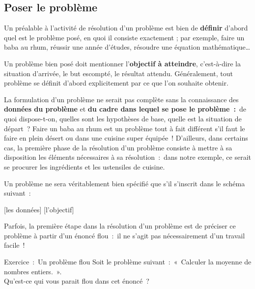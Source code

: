 	\subsection{Poser le problème }
	
		Un préalable à l’activité de résolution d’un problème est bien de
		\textbf{définir} d’abord quel est le problème posé, en quoi il consiste
		exactement ; par exemple, faire un baba au rhum, réussir une année
		d’études, résoudre une équation mathématique\dots
		
		Un problème bien posé doit mentionner l’\textbf{objectif à atteindre},
		c’est-à-dire la situation d’arrivée, le but escompté, le résultat
		attendu. Généralement, tout problème se définit d’abord explicitement
		par ce que l’on souhaite obtenir.
		
		La formulation d’un problème ne serait pas complète sans la connaissance
		des \textbf{données du problème} et \textbf{du cadre dans lequel se
		pose le problème~:}~de quoi dispose-t-on, quelles sont les hypothèses
		de base, quelle est la situation de départ~? Faire un baba au rhum est
		un problème tout à fait différent s’il faut le faire en plein désert ou
		dans une cuisine super équipée~! D’ailleurs, dans certains cas, la
		première phase de la résolution d’un problème consiste à mettre à sa
		disposition les éléments nécessaires à sa résolution~:~dans notre
		exemple, ce serait se procurer les ingrédients et les ustensiles de
		cuisine.
	
		Un problème ne sera véritablement bien spécifié que s’il s’inscrit dans
		le schéma suivant~:
		
		\begin{center}
		\begin{Ovalbox}
		{ [les données]  [l’objectif]}
		\end{Ovalbox}
		\end{center}
	
		Parfois, la première étape dans la résolution d’un problème est de
		préciser ce problème à partir d’un énoncé flou~:~il ne s’agit pas
		nécessairement d’un travail facile~!

		\begin{Emphase}[exercice]{Exercice~:~Un problème flou}
			Soit le problème suivant~:~«~Calculer la moyenne de nombres entiers.~».
			\\Qu’est-ce qui vous parait flou dans cet énoncé~?
		\end{Emphase}


